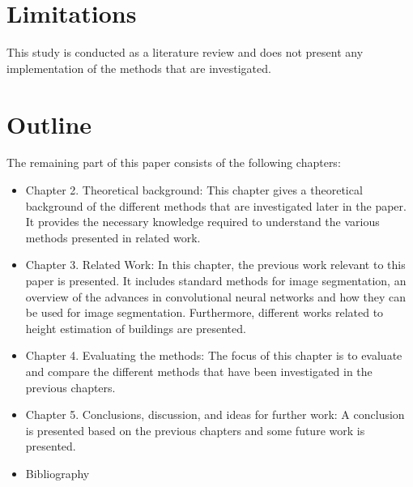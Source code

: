 \section{Limitations}

This study is conducted as a literature review and does not present any implementation of the methods that are investigated.

\section{Outline}
The remaining part of this paper consists of the following chapters:

\begin{itemize}
\item Chapter 2. Theoretical background: This chapter gives a theoretical background of the different methods that are investigated later in the paper. It provides the necessary knowledge required to understand the various methods presented in related work.
\item Chapter 3. Related Work: In this chapter, the previous work relevant to this paper is presented. It includes standard methods for image segmentation, an overview of the advances in convolutional neural networks and how they can be used for image segmentation. Furthermore, different works related to height estimation of buildings are presented.
\item Chapter 4. Evaluating the methods: The focus of this chapter is to evaluate and compare the different methods that have been investigated in the previous chapters.
\item Chapter 5. Conclusions, discussion, and ideas for further work: A conclusion is presented based on the previous chapters and some future work is presented.
\item Bibliography
\end{itemize}
